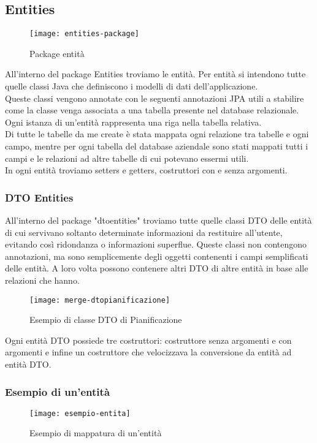 \subsection{Entities}

\begin{figure}[H] 
    \centering 
    \texttt{[image: entities-package]} 
    \caption{Package entità}
\end{figure}

\noindent All'interno del package Entities troviamo le entità. Per entità si intendono tutte quelle classi Java che definiscono i modelli di dati dell'applicazione.\\
Queste classi vengono annotate con le seguenti annotazioni JPA utili a stabilire come la classe venga associata a una tabella presente nel database relazionale. Ogni istanza di un'entità rappresenta una riga nella tabella relativa.\\
Di tutte le tabelle da me create è stata mappata ogni relazione tra tabelle e ogni campo, mentre per ogni tabella del database aziendale sono stati mappati tutti i campi e le relazioni ad altre tabelle di cui potevano essermi utili.\\
In ogni entità troviamo setters e getters, costruttori con e senza argomenti.\\
\subsubsection{DTO Entities}
All'interno del package "dtoentities" troviamo tutte quelle classi DTO delle entità di cui servivano soltanto determinate informazioni da restituire all'utente, evitando così ridondanza o informazioni superflue. Queste classi non contengono annotazioni, ma sono semplicemente degli oggetti contenenti i campi semplificati delle entità. A loro volta possono contenere altri DTO di altre entità in base alle relazioni che hanno.
\begin{figure}[H] 
    \centering 
    \texttt{[image: merge-dtopianificazione]} 
    \caption{Esempio di classe DTO di Pianificazione}
\end{figure}
\noindent Ogni entità DTO possiede tre costruttori: costruttore senza argomenti e con argomenti e infine un costruttore che velocizzava la conversione da entità ad entità DTO.

\subsubsection{Esempio di un'entità}
\begin{figure}[H] 
    \centering 
    \texttt{[image: esempio-entita]} 
    \caption{Esempio di mappatura di un'entità}
\end{figure}

